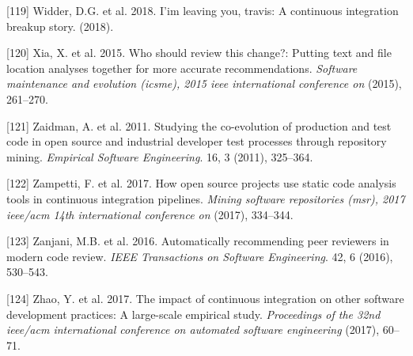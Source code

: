 \documentclass[]{book}
\begin{document}
\hypertarget{ref-widder2018m}{}
{[}119{]} Widder, D.G. et al. 2018. I'im leaving you, travis: A
continuous integration breakup story. (2018).

\hypertarget{ref-xia2015should}{}
{[}120{]} Xia, X. et al. 2015. Who should review this change?: Putting
text and file location analyses together for more accurate
recommendations. \emph{Software maintenance and evolution (icsme), 2015
ieee international conference on} (2015), 261--270.

\hypertarget{ref-zaidman2011studying}{}
{[}121{]} Zaidman, A. et al. 2011. Studying the co-evolution of
production and test code in open source and industrial developer test
processes through repository mining. \emph{Empirical Software
Engineering}. 16, 3 (2011), 325--364.

\hypertarget{ref-zampetti2017open}{}
{[}122{]} Zampetti, F. et al. 2017. How open source projects use static
code analysis tools in continuous integration pipelines. \emph{Mining
software repositories (msr), 2017 ieee/acm 14th international conference
on} (2017), 334--344.

\hypertarget{ref-zanjani2016automatically}{}
{[}123{]} Zanjani, M.B. et al. 2016. Automatically recommending peer
reviewers in modern code review. \emph{IEEE Transactions on Software
Engineering}. 42, 6 (2016), 530--543.

\hypertarget{ref-zhao2017impact}{}
{[}124{]} Zhao, Y. et al. 2017. The impact of continuous integration on
other software development practices: A large-scale empirical study.
\emph{Proceedings of the 32nd ieee/acm international conference on
automated software engineering} (2017), 60--71.
\end{document}
